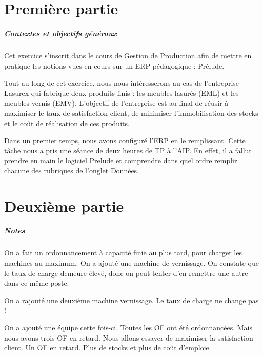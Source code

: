 \documentclass{scrreprt}
\begin{document}
\tableofcontents

\chapter{Première partie}

\paragraph{Contextes et objectifs généraux}
Cet exercice s'inscrit dans le cours de Gestion de Production afin de mettre en pratique les notions
vues en cours sur un ERP pédagogique :  Prélude. 

Tout au long de cet exercice, nous nous intéresserons au cas de l'entreprise Lasurex qui fabrique deux
produits finis : les meubles lasurés (EML) et les meubles vernis (EMV). L'objectif de l'entreprise est 
au final de réusir à maximiser le taux de satisfaction client, de minimiser l'immobilisation des stocks et
le coût de réalisation de ces produits. 

Dans un premier temps, nous avons configuré l'ERP en le remplissant. Cette tâche nous a pris une séance de deux
heures de TP à l'AIP. En effet, il a fallut prendre en main le logiciel Prelude et comprendre dans quel ordre
remplir chacune des rubriques de l'onglet Données. 

\chapter{Deuxième partie} 


\paragraph{Notes}

On a fait un ordonnancement à capacité finie au plus tard, pour charger les machines au maximum. 
On a ajouté une machine de vernissage. On constate que le taux de charge demeure élevé, donc on peut 
tenter d'en remettre une autre dans ce même poste.

On a rajouté une deuxième machine vernissage. Le taux de charge ne change pas ! 

On a ajouté une équipe cette fois-ci. Toutes les OF ont été ordonnancées. Mais nous avons
trois OF en retard. Nous allons essayer de maximiser la satisfaction client. Un OF en retard.
Plus de stocks et plus de coût d'emploie. 
\end{document}
